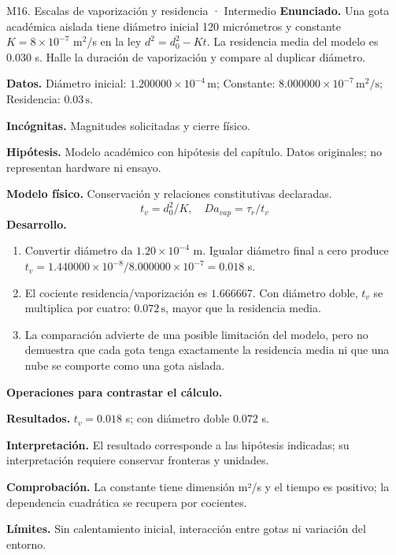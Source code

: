 \begin{studiumworked}{M16. Escalas de vaporización y residencia · Intermedio}
\textbf{Enunciado.} Una gota académica aislada tiene diámetro inicial 120 micrómetros y constante $K=8\times10^{-7}$ m$^2$/s en la ley $d^2=d_0^2-Kt$. La residencia media del modelo es 0.030 s. Halle la duración de vaporización y compare al duplicar diámetro.

\textbf{Datos.} Diámetro inicial: $1.200000\times10^{-4}\,\mathrm{m}$; Constante: $8.000000\times10^{-7}\,\mathrm{m^2/s}$; Residencia: $0.03\,\mathrm{s}$.

\textbf{Incógnitas.} Magnitudes solicitadas y cierre físico.

\textbf{Hipótesis.} Modelo académico con hipótesis del capítulo. Datos originales; no representan hardware ni ensayo.

\textbf{Modelo físico.} Conservación y relaciones constitutivas declaradas.
\[t_v=d_0^2/K,\quad Da_{vap}=\tau_r/t_v\]
\textbf{Desarrollo.}
\begin{enumerate}
\item Convertir diámetro da $1.20\times10^{-4}$ m. Igualar diámetro final a cero produce $t_v=1.440000\times10^{-8}/8.000000\times10^{-7}=0.018$ s.
\item El cociente residencia/vaporización es $1.666667$. Con diámetro doble, $t_v$ se multiplica por cuatro: $0.072\,\mathrm{s}$, mayor que la residencia media.
\item La comparación advierte de una posible limitación del modelo, pero no demuestra que cada gota tenga exactamente la residencia media ni que una nube se comporte como una gota aislada.
\end{enumerate}
\textbf{Operaciones para contrastar el cálculo.}

\textbf{Resultados.} $t_v=0.018$ s; con diámetro doble $0.072$ s.

\textbf{Interpretación.} El resultado corresponde a las hipótesis indicadas; su interpretación requiere conservar fronteras y unidades.

\textbf{Comprobación.} La constante tiene dimensión m²/s y el tiempo es positivo; la dependencia cuadrática se recupera por cocientes.

\textbf{Límites.} Sin calentamiento inicial, interacción entre gotas ni variación del entorno.
\end{studiumworked}

